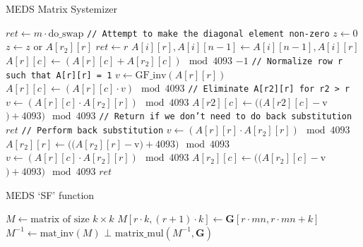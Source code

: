\begin{algorithm}
  \caption{MEDS Matrix Systemizer}
  \label{alg:systemizer}
  \begin{algorithmic}
      \State $ret \gets m \cdot \text{do\_swap}$
        \State \texttt{// Attempt to make the diagonal element non-zero}
          \State $z \gets 0$
            \State $z \gets z$ or $A[r_2][r]$
          \EndFor
            \State $ret \gets r$
              \State $A[i][r], A[i][n-1] \gets A[i][n-1], A[i][r]$
            \EndFor
          \EndIf
        \EndIf
              \State $A[r][c] \gets (A[r][c] + A[r_2][c]) \mod 4093$
            \EndFor
          \EndIf
        \EndFor
          \State \Return $-1$
        \EndIf
        \State \texttt{// Normalize row r such that A[r][r] = 1}
        \State $v \gets \text{GF\_inv}(A[r][r])$
          \State $A[r][c] \gets (A[r][c] \cdot v) \mod 4093$
        \EndFor
        \State \texttt{// Eliminate A[r2][r] for r2 > r}
            \State $v \gets (A[r][c] \cdot A[r_2][r]) \mod 4093$
            \State $A[r2][c] \gets ((A[r2][c] - $v$) + 4093) \mod 4093$
          \EndFor
        \EndFor
      \EndFor
      \State \texttt{// Return if we don't need to do back substitution}
        \State \Return $ret$
      \EndIf
      \State \texttt{// Perform back substitution}
          \State $v \gets (A[r][r] \cdot A[r_2][r]) \mod 4093$
          \State $A[r_2][r] \gets ((A[r_2][r] - $v$) + 4093) \mod 4093$
            \State $v \gets (A[r][c] \cdot A[r_2][r]) \mod 4093$
            \State $A[r_2][c] \gets ((A[r_2][c] - $v$) + 4093) \mod 4093$
          \EndFor
        \EndFor
      \EndFor
      \State \Return $ret$
    \EndFunction
  \end{algorithmic}
\end{algorithm}

\begin{algorithm}
  \caption{MEDS `SF' function}
  \label{alg:medssffunction}
  \begin{algorithmic}
      \State $M \gets \text{matrix of size } k \times k$
        \State $M[r \cdot k, (r+1) \cdot k] \gets \textbf{G}[r \cdot mn, r \cdot mn + k]$
      \EndFor
      \State $M^{-1} \gets \text{mat\_inv}(M)$
        \State \Return $\bot$
      \EndIf
      \State \Return $\text{matrix\_mul}(M^{-1}, \textbf{G})$
    \EndFunction
  \end{algorithmic}
\end{algorithm}


